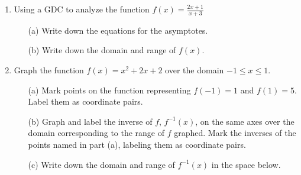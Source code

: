 \documentclass[12pt, oneside]{article}
\begin{document}
\begin{enumerate}
    \item Using a GDC to analyze the function $\displaystyle f(x)= \frac {2x+1}{x+3}$
    \begin{itemize}
        \item[(a)] Write down the equations for the asymptotes.
    	\item[(b)] Write down the domain and range of $f(x)$.
    \end{itemize}

\newpage
    \item Graph the function $f(x)=x^2+2x+2$ over the domain $-1 \leq x\leq 1$.
    \begin{itemize}
        \item[(a)] Mark points on the function representing $f(-1)=1$ and $f(1)=5$. Label them as coordinate pairs.
    	\item[(b)] Graph and label the inverse of $f$, $f^{-1}(x)$, on the same axes over the domain corresponding to the range of $f$ graphed. Mark the inverses of the points named in part (a), labeling them as coordinate pairs.
    	\item[(c)] Write down the domain and range of $f^{-1}(x)$ in the space below. \vspace{2cm}
    \end{itemize}


  \end{enumerate}
\end{document}
